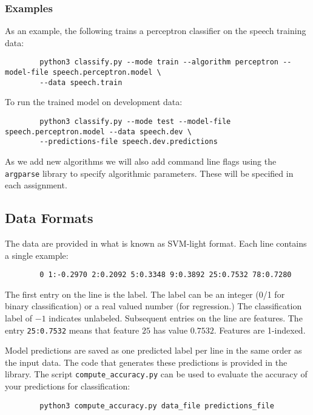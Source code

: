 \documentclass[11pt]{article}
\begin{document}
	\subsubsection{Examples}
	As an example, the following trains a perceptron classifier on the speech training data:
	\begin{footnotesize}
		\begin{verbatim}
		python3 classify.py --mode train --algorithm perceptron --model-file speech.perceptron.model \
		--data speech.train
		\end{verbatim}
	\end{footnotesize}
	To run the trained model on development data:
	\begin{footnotesize}
		\begin{verbatim}
		python3 classify.py --mode test --model-file speech.perceptron.model --data speech.dev \
		--predictions-file speech.dev.predictions
		\end{verbatim}
	\end{footnotesize}
	
	As we add new algorithms we will also add command line flags using the {\tt argparse} library to specify algorithmic parameters. These will be specified in each assignment.
	
	\subsection{Data Formats}
	The data are provided in what is known as SVM-light format. Each line contains a single example:
	\begin{footnotesize}
		\begin{verbatim}
		0 1:-0.2970 2:0.2092 5:0.3348 9:0.3892 25:0.7532 78:0.7280
		\end{verbatim}
	\end{footnotesize}
	The first entry on the line is the label. The label can be an integer (0/1 for binary classification) or a real valued number (for regression.) The classification label of $-1$ indicates unlabeled. Subsequent entries on the line are features. The entry {\tt 25:0.7532} means that feature $25$ has value $0.7532$. Features are 1-indexed.
	
	Model predictions are saved as one predicted label per line in the same order as the input data. The code that generates these predictions is provided in the library. The script {\tt compute\_accuracy.py} can be used to evaluate the accuracy of your predictions for classification:
	\begin{footnotesize}
		\begin{verbatim}
		python3 compute_accuracy.py data_file predictions_file
		\end{verbatim}
	\end{footnotesize}
	
\end{document}
